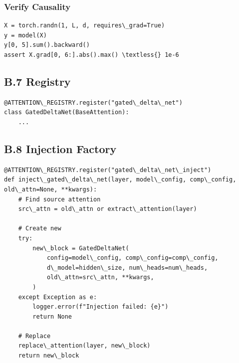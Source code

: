 \subsubsection{Verify Causality}

\begin{lstlisting}
X = torch.randn(1, L, d, requires\_grad=True)
y = model(X)
y[0, 5].sum().backward()
assert X.grad[0, 6:].abs().max() \textless{} 1e-6
\end{lstlisting}

\subsection{B.7 Registry}

\begin{lstlisting}
@ATTENTION\_REGISTRY.register("gated\_delta\_net")
class GatedDeltaNet(BaseAttention):
    ...
\end{lstlisting}

\subsection{B.8 Injection Factory}

\begin{lstlisting}
@ATTENTION\_REGISTRY.register("gated\_delta\_net\_inject")
def inject\_gated\_delta\_net(layer, model\_config, comp\_config, old\_attn=None, **kwargs):
    # Find source attention
    src\_attn = old\_attn or extract\_attention(layer)
    
    # Create new
    try:
        new\_block = GatedDeltaNet(
            config=model\_config, comp\_config=comp\_config,
            d\_model=hidden\_size, num\_heads=num\_heads,
            old\_attn=src\_attn, **kwargs,
        )
    except Exception as e:
        logger.error(f"Injection failed: {e}")
        return None
    
    # Replace
    replace\_attention(layer, new\_block)
    return new\_block
\end{lstlisting}

